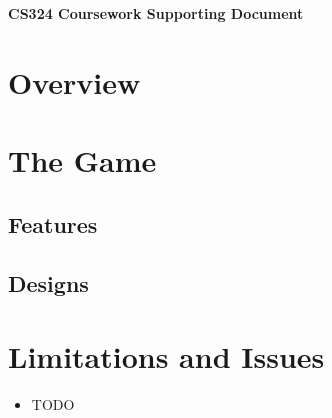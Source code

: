 \documentclass[12pt, a4paper, oneside]{article}
\begin{document}
    \LARGE
    \begin{center}
        \textbf{CS324 Coursework Supporting Document}
    \end{center}

    \normalsize
    \flushleft

    \section{Overview}

    \section{The Game}

    \subsection{Features}

    \subsection{Designs}
    
    \section{Limitations and Issues}
    \begin{itemize}[label=\(\diamond\)]
        \item TODO
    \end{itemize}

\end{document}
